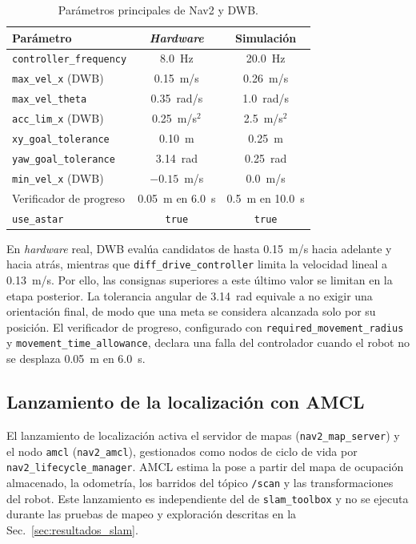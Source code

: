 \begin{appendices}
\begin{table}[H]
\centering
\caption{Parámetros principales de Nav2 y DWB.}
\label{tab:anx_nav2_dwb_params}
\small
\begin{tabular}{lcc}
\toprule
\textbf{Parámetro} & \textbf{\textit{Hardware}} & \textbf{Simulación} \\
\midrule
\texttt{controller\_frequency} & 8.0~Hz & 20.0~Hz \\
\texttt{max\_vel\_x} (DWB) & 0.15~m/s & 0.26~m/s \\
\texttt{max\_vel\_theta} & 0.35~rad/s & 1.0~rad/s \\
\texttt{acc\_lim\_x} (DWB) & 0.25~m/s$^2$ & 2.5~m/s$^2$ \\
\texttt{xy\_goal\_tolerance} & 0.10~m & 0.25~m \\
\texttt{yaw\_goal\_tolerance} & 3.14~rad & 0.25~rad \\
\texttt{min\_vel\_x} (DWB) & $-0.15$~m/s & 0.0~m/s \\
Verificador de progreso & 0.05~m en 6.0~s & 0.5~m en 10.0~s \\
\texttt{use\_astar} & \texttt{true} & \texttt{true} \\
\bottomrule
\end{tabular}
\end{table}

\noindent En \textit{hardware} real, DWB evalúa candidatos de hasta 0.15~m/s hacia
adelante y hacia atrás, mientras que \texttt{diff\_drive\_controller} limita
la velocidad lineal a 0.13~m/s. Por ello, las consignas superiores a este
último valor se limitan en la etapa posterior. La tolerancia angular de
3.14~rad equivale a no exigir una orientación final, de modo que una meta se
considera alcanzada solo por su posición. El verificador de progreso,
configurado con \texttt{required\_movement\_radius} y
\texttt{movement\_time\_allowance}, declara una falla del controlador cuando
el robot no se desplaza 0.05~m en 6.0~s.

\subsection{Lanzamiento de la localización con AMCL}
\label{anx:amcl_lanzamiento}

El lanzamiento de localización activa el servidor de mapas
(\texttt{nav2\_map\_server}) y el nodo \texttt{amcl}
(\texttt{nav2\_amcl}), gestionados como nodos de ciclo de vida por
\texttt{nav2\_lifecycle\_manager}. AMCL estima la pose a partir del mapa de
ocupación almacenado, la odometría, los barridos del tópico \texttt{/scan} y
las transformaciones del robot. Este lanzamiento es independiente del de
\texttt{slam\_toolbox} y no se ejecuta durante las pruebas de mapeo y
exploración descritas en la Sec.~\ref{sec:resultados_slam}.


\end{appendices}

